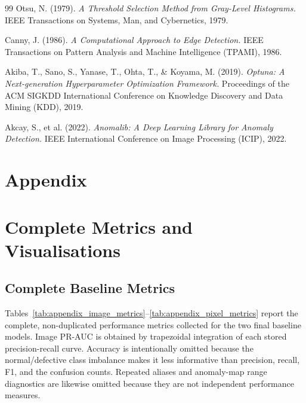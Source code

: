 \documentclass[11pt, a4paper]{article}
\begin{document}
\begin{thebibliography}{99}
Otsu, N. (1979).
\textit{A Threshold Selection Method from Gray-Level Histograms.}
IEEE Transactions on Systems, Man, and Cybernetics, 1979.

Canny, J. (1986).
\textit{A Computational Approach to Edge Detection.}
IEEE Transactions on Pattern Analysis and Machine Intelligence (TPAMI), 1986.

Akiba, T., Sano, S., Yanase, T., Ohta, T., \& Koyama, M. (2019).
\textit{Optuna: A Next-generation Hyperparameter Optimization Framework.}
Proceedings of the ACM SIGKDD International Conference on Knowledge Discovery and Data Mining (KDD), 2019.

Akcay, S., et al. (2022).
\textit{Anomalib: A Deep Learning Library for Anomaly Detection.}
IEEE International Conference on Image Processing (ICIP), 2022.

\end{thebibliography}

\clearpage
\appendix
\section*{Appendix}
\section{Complete Metrics and Visualisations}
\label{sec:complete_metrics}

\subsection*{Complete Baseline Metrics}

Tables~\ref{tab:appendix_image_metrics}--\ref{tab:appendix_pixel_metrics} report the complete, non-duplicated performance metrics collected for the two final baseline models. Image PR-AUC is obtained by trapezoidal integration of each stored precision-recall curve. Accuracy is intentionally omitted because the normal/defective class imbalance makes it less informative than precision, recall, F1, and the confusion counts. Repeated aliases and anomaly-map range diagnostics are likewise omitted because they are not independent performance measures.
\end{document}
